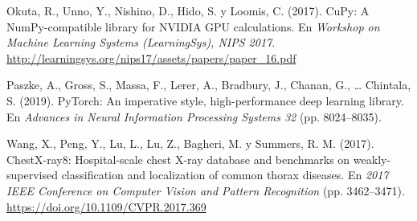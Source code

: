 \documentclass[11pt,letterpaper]{article}
\begin{document}
{Okuta, R., Unno, Y., Nishino, D., Hido, S. y Loomis, C. (2017). CuPy: A NumPy-compatible library for NVIDIA GPU calculations. En \textit{Workshop on Machine Learning Systems (LearningSys), NIPS 2017}. \url{http://learningsys.org/nips17/assets/papers/paper_16.pdf}

Paszke, A., Gross, S., Massa, F., Lerer, A., Bradbury, J., Chanan, G., \ldots{} Chintala, S. (2019). PyTorch: An imperative style, high-performance deep learning library. En \textit{Advances in Neural Information Processing Systems 32} (pp. 8024--8035).

Wang, X., Peng, Y., Lu, L., Lu, Z., Bagheri, M. y Summers, R. M. (2017). ChestX-ray8: Hospital-scale chest X-ray database and benchmarks on weakly-supervised classification and localization of common thorax diseases. En \textit{2017 IEEE Conference on Computer Vision and Pattern Recognition} (pp. 3462--3471). \url{https://doi.org/10.1109/CVPR.2017.369}
\par}
\end{document}
